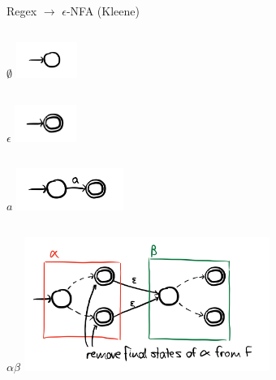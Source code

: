 \documentclass{beamer}
\begin{document}
\begin{frame}{Regex $\to$ $\epsilon$-NFA (Kleene)}
    \begin{columns}
        $\boldsymbol{\emptyset}$
        \includegraphics[width=2cm]{materials/images/regex_to_nfa_emptyset.png}
    \end{columns}\pause
    \begin{columns}
        $\epsilon$
        \includegraphics[width=2cm]{materials/images/regex_to_nfa_epsilon.png}
    \end{columns}\pause
    \begin{columns}
        $a$
        \includegraphics[width=3.5cm]{materials/images/regex_to_nfa_symbol.png}
    \end{columns}\pause
    \begin{columns}
        $\alpha \beta$
        \includegraphics[width=8cm]{materials/images/regex_to_nfa_concatenation.png}
    \end{columns}
\end{frame}
\end{document}
